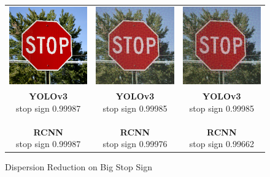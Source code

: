 \documentclass{article}
\begin{document}
\begin{figure}[h]
\centering
    \begin{tabular}{c c c}
        \includegraphics[width=0.3\linewidth]{../test_images/stop.png} & \includegraphics[width=0.3\linewidth]{../test_images/dispersion_reduced/stop25.png} & \includegraphics[width=0.3\linewidth]{../test_images/dispersion_reduced/stop50.png} \\

        \makecell[t]{\textbf{YOLOv3} \\ stop sign 0.99987 \\ \\ \textbf{RCNN} \\ stop sign 0.99987} & \makecell[t]{\textbf{YOLOv3} \\ stop sign 0.99985 \\ \\ \textbf{RCNN} \\ stop sign 0.99976} & \makecell[t]{\textbf{YOLOv3} \\ stop sign 0.99985 \\ \\ \textbf{RCNN} \\ stop sign 0.99662}
\end{tabular}
\caption{Dispersion Reduction on Big Stop Sign}
\label{fig:stop1}
\end{figure}
\end{document}
